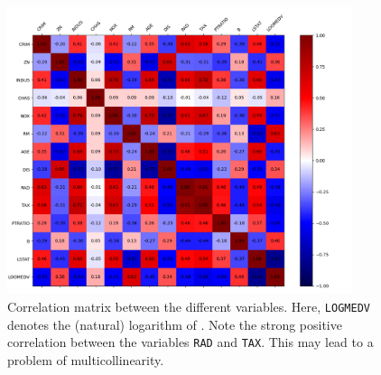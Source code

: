 \documentclass[10pt]{article}
\newcounter{prob}
\begin{document}
    \begin{figure}[H]
    \begin{center}
        \includegraphics[width=0.9\textwidth]{correlation.png}
    \end{center}
    \caption{
        Correlation matrix between the different variables. Here, \texttt{LOGMEDV}
        denotes the (natural) logarithm of . Note the strong positive
        correlation between the variables \texttt{RAD} and \texttt{TAX}. This may
        lead to a problem of multicollinearity.
    }
    \label{fig:correlation}
    \end{figure}
\end{document}

